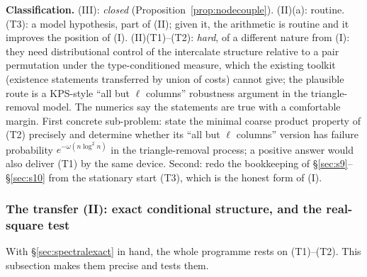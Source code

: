 \medskip
\noindent\textbf{Classification.}  (III): \emph{closed}
(Proposition~\ref{prop:nodecouple}).  (II)(a): routine.  (T3): a model
hypothesis, part of (II); given it, the arithmetic is routine and it
improves the position of (I).  (II)(T1)--(T2): \emph{hard}, of
a different nature from (I): they need distributional control of the
intercalate structure relative to a pair permutation under the
type-conditioned measure, which the existing toolkit (existence
statements transferred by union of costs) cannot give; the
plausible route is a KPS-style ``all but $\ell$ columns'' robustness
argument in the triangle-removal model.  The numerics say the
statements are true with a comfortable margin.  First concrete
sub-problem: state the minimal coarse product property of (T2)
precisely and determine whether its ``all but $\ell$ columns''
version has failure probability $e^{-\omega(n\log^2n)}$ in the
triangle-removal process; a positive answer would also deliver (T1)
by the same device.  Second: redo the bookkeeping of
\S\ref{sec:s9}--\S\ref{sec:s10} from the stationary start (T3),
which is the honest form of (I).

\subsubsection{The transfer (II): exact conditional structure, and the real-square test}
\label{sec:s13transfer2}

With \S\ref{sec:spectralexact} in hand, the whole programme rests on
(T1)--(T2).  This subsection makes them precise and tests them.

